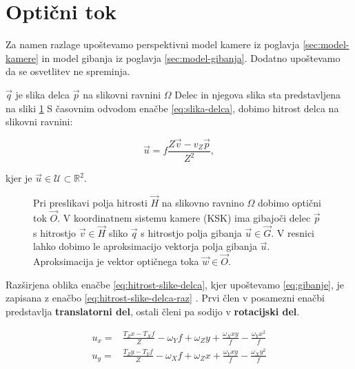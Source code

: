 \section{Optični tok} \label{sec:opticni-tok}
Za namen razlage upoštevamo perspektivni model kamere iz poglavja \ref{sec:model-kamere} in model gibanja iz poglavja \ref{sec:model-gibanja}. Dodatno upoštevamo da se osvetlitev ne spreminja.

$\vec{q}$ je slika delca $\vec{p}$ na slikovni ravnini $\mathit{\Omega}$ Delec in njegova slika sta predstavljena na sliki \ref{fig:optical-flow} S časovnim odvodom enačbe \eqref{eq:slika-delca}, dobimo hitrost delca na slikovni ravnini:

\begin{equation}\label{eq:hitrost-slike-delca}
	\vec{u} = f \frac{Z\vec{v}-v_Z\vec{p}}{Z^2},
\end{equation}

kjer je $\vec{u} \in \mathcal{U} \subset \mathbb{R}^2$.




\begin{figure}[htb]
\centering

\caption[Preslikava hitrosti delca na slikovno ravnino $\mathit{\Omega}$]{Pri preslikavi polja hitrosti $\vec{H}$ na slikovno ravnino $\mathit{\Omega}$ dobimo optični tok $\vec{O}$. V koordinatnem sistemu kamere (KSK) ima gibajoči delec $\vec{p}$ s hitrostjo $\vec{v} \in \vec{H}$ sliko $\vec{q}$ s hitrostjo polja gibanja $\vec{u} \in \vec{G}$. V resnici lahko dobimo le aproksimacijo vektorja polja gibanja $\vec{u}$. Aproksimacija je vektor optičnega toka $\vec{w} \in \vec{O}$.}
\label{fig:optical-flow}
\end{figure}




Razširjena oblika enačbe \eqref{eq:hitrost-slike-delca}, kjer upoštevamo \eqref{eq:gibanje}, je zapisana z enačbo \eqref{eq:hitrost-slike-delca-raz} \cite{trucco1998introductory}. Prvi člen v posamezni enačbi predstavlja \textbf{translatorni del}, ostali členi pa sodijo v \textbf{rotacijski del}.

\begin{equation}\label{eq:hitrost-slike-delca-raz}
\begin{aligned}
	u_x = & \frac{T_Z x - T_X f}{Z} - \omega_Y f + \omega_Z y + \frac{\omega_X x y}{f} - \frac{\omega_Y x^2}{f} \\
    u_y = & \frac{T_Z y - T_Y f}{Z} - \omega_X f + \omega_Z x + \frac{\omega_Y x y}{f} - \frac{\omega_X y^2}{f}
\end{aligned}
\end{equation}

